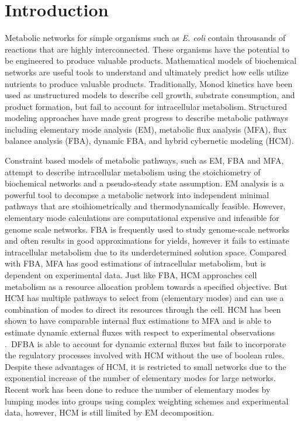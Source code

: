 \documentclass[10pt,twocolumn,twoside,final]{IEEEtran}
\begin{document}
\section{Introduction}
Metabolic networks for simple organisms such as \textit{E. coli} contain throusands of reactions that are highly interconnected. 
These organisms have the potential to be engineered to produce valuable products.
Mathematical models of biochemical networks are useful tools to understand and ultimately predict how cells utilize nutrients to produce valuable products. 
Traditionally, Monod kinetics have been used as unstructured models to describe cell growth, substrate consumption, and product formation, but fail to account for intracellular metabolism\cite{shuler_book}. 
Structured modeling approaches have made great progress to describe metabolic pathways including elementary mode analysis (EM)\cite{2006_vonKamp_Metatool}, metabolic flux analysis (MFA), flux balance analysis (FBA)\cite{2010_orth_NatBiotech}, dynamic FBA\cite{1994_varma_palsson_ApplEnvMicro,2002_Mahadevan_BiophysJ}, and hybrid cybernetic modeling (HCM)\cite{2008_kim_varner_ramkrishna_BiotechProg}. 

Constraint based models of metabolic pathways, such as EM, FBA and MFA, attempt to describe intracellular metabolism using the stoichiometry of biochemical networks and a pseudo-steady state assumption\cite{2010_orth_NatBiotech}.
EM analysis is a powerful tool to decompse a metabolic network into independent minimal pathways that are stoihiometrically and thermodynamically feasible. 
However, elementary mode calculations are computational expensive and infeasible for genome scale networks\cite{2004_lee_varner_ko_ieee}.
FBA is frequently used to study genome-scale networks\cite{2010_orth_NatBiotech} and often results in good approximations for yields, however it fails to estimate intracellular metabolism due to its underdetermined solution space. 
Compared with FBA, MFA has good estimations of intracellular metabolism, but is dependent on experimental data.
Just like FBA, HCM approaches cell metabolism as a resource allocation problem towards a specified objective. But HCM has multiple pathways to select from (elementary modes) and can use a combination of modes to direct its resources through the cell. 
HCM has been shown to have comparable internal flux estimations to MFA and is able to estimate dynamic external fluxes with respect to experimental observations \cite{2008_kim_varner_ramkrishna_BiotechProg}.\
DFBA is able to account for dynamic external fluxes but fails to incorporate the regulatory processes involved with HCM without the use of boolean rules\cite{2001_covert_schilling_palsson}.
Despite these advantages of HCM, it is restricted to small networks due to the exponential increase of the number of elementary modes for large networks.   
Recent work has been done to reduce the number of elementary modes by lumping modes into groups using complex weighting schemes and experimental data\cite{2010_song_ramkrishna}, however, HCM is still limited by EM decomposition.
\end{document}
